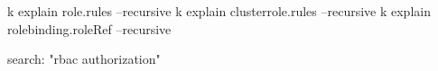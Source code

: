 \begin{tcbitemize}[
  raster columns=2, raster equal height=rows,
  blanker, cheat subtitle
]
\begin{tcbitemize}[
      raster columns=1, raster equal height=rows,
      blanker, cheat subtitle
    ]
      \tcbitem

        \begin{cheatcodebash}
        k explain role.rules --recursive
        k explain clusterrole.rules --recursive
        k explain rolebinding.roleRef --recursive
        \end{cheatcodebash}

        \begin{cheatcodebash}
        search: "rbac authorization"
        \end{cheatcodebash}

    \end{tcbitemize}

\end{tcbitemize}
